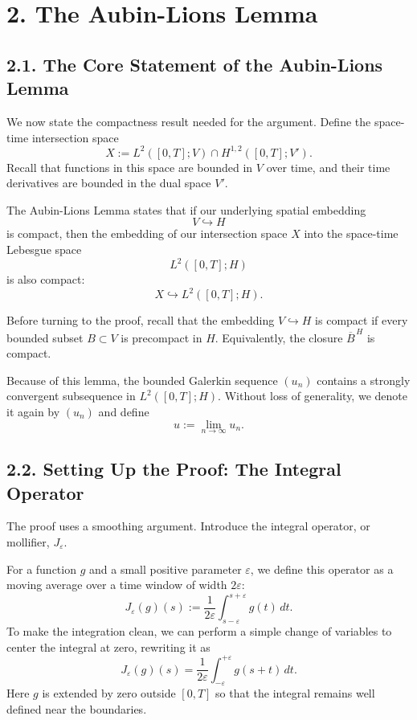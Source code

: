 \documentclass[11pt]{article}
\theoremstyle{definition}
\theoremstyle{remark}
\begin{document}
\section*{2. The Aubin-Lions Lemma}

\subsection*{2.1. The Core Statement of the Aubin-Lions Lemma}
We now state the compactness result needed for the argument. Define the space-time intersection space
\[
X:=L^2([0,T];V)\cap H^{1,2}([0,T];V').
\]
Recall that functions in this space are bounded in \(V\) over time, and their time derivatives are bounded in the dual space \(V'\).

The Aubin-Lions Lemma states that if our underlying spatial embedding
\[
V\hookrightarrow H
\]
is compact, then the embedding of our intersection space \(X\) into the space-time Lebesgue space
\[
L^2([0,T];H)
\]
is also compact:
\[
X\hookrightarrow L^2([0,T];H).
\]

Before turning to the proof, recall that the embedding \(V\hookrightarrow H\) is compact if every bounded subset \(B\subset V\) is precompact in \(H\). Equivalently, the closure \(\overline{B}^{\,H}\) is compact.

Because of this lemma, the bounded Galerkin sequence \((u_n)\) contains a strongly convergent subsequence in \(L^2([0,T];H)\). Without loss of generality, we denote it again by \((u_n)\) and define
\[
u:=\lim_{n\to\infty}u_n.
\]

\subsection*{2.2. Setting Up the Proof: The Integral Operator}
The proof uses a smoothing argument. Introduce the integral operator, or mollifier, \(J_\varepsilon\).

For a function \(g\) and a small positive parameter \(\varepsilon\), we define this operator as a moving average over a time window of width \(2\varepsilon\):
\[
J_\varepsilon(g)(s):=\frac{1}{2\varepsilon}\int_{s-\varepsilon}^{s+\varepsilon} g(t)\,dt.
\]
To make the integration clean, we can perform a simple change of variables to center the integral at zero, rewriting it as
\[
J_\varepsilon(g)(s)=\frac{1}{2\varepsilon}\int_{-\varepsilon}^{+\varepsilon} g(s+t)\,dt.
\]
Here \(g\) is extended by zero outside \([0,T]\) so that the integral remains well defined near the boundaries.
\end{document}
